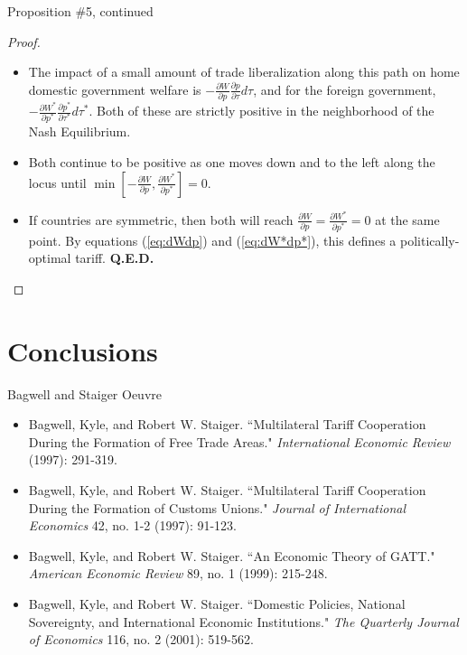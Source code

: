 \documentclass[aspectratio=169]{beamer}
\begin{document}

\begin{frame}{Proposition \#5, continued}

\begin{proof}
    \begin{itemize}
        \item The impact of a small amount of trade liberalization along this path on home domestic government welfare is $ -\frac{\partial W}{\partial p} \frac{\partial p}{\partial \tau} d\tau $, and for the foreign government, $ -\frac{\partial W^{*}}{\partial p^{*}} \frac{\partial p^{*}}{\partial \tau^{*}} d\tau^{*} $.  Both of these are strictly positive in the neighborhood of the Nash Equilibrium.
        \item Both continue to be positive as one moves down and to the left along the locus until $ \min\left[ -\frac{\partial W}{\partial p}, \frac{\partial W^{*}}{\partial p^{*}} \right] = 0 $.
        \item If countries are symmetric, then both will reach $ \frac{\partial W}{\partial p} = \frac{\partial W^{*}}{\partial p^{*}} = 0 $ at the same point.  By equations (\ref{eq:dWdp}) and (\ref{eq:dW*dp*}), this defines a politically-optimal tariff.  \textbf{Q.E.D.}
    \end{itemize}
\end{proof}
    
\end{frame}


\section{Conclusions}


\begin{frame}{Bagwell and Staiger Oeuvre}

\begin{itemize}
    \item Bagwell, Kyle, and Robert W. Staiger. ``Multilateral Tariff Cooperation During the Formation of Free Trade Areas." \emph{International Economic Review} (1997): 291-319.
    \item Bagwell, Kyle, and Robert W. Staiger. ``Multilateral Tariff Cooperation During the Formation of Customs Unions." \emph{Journal of International Economics} 42, no. 1-2 (1997): 91-123.
    \item Bagwell, Kyle, and Robert W. Staiger. ``An Economic Theory of GATT." \emph{American Economic Review} 89, no. 1 (1999): 215-248.
    \item Bagwell, Kyle, and Robert W. Staiger. ``Domestic Policies, National Sovereignty, and International Economic Institutions." \emph{The Quarterly Journal of Economics} 116, no. 2 (2001): 519-562. 
\end{itemize}
    
\end{frame}
\end{document}
